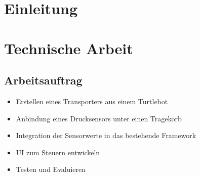 \documentclass[a4paper,12pt,headsepline,toc=flat]{scrartcl}
\begin{document}
	\tableofcontents
	\newpage
	
	\section{Einleitung}
	
	\newpage
	\section{Technische Arbeit}
	
	\subsection{Arbeitsauftrag}
		\begin{itemize}
			\item Erstellen eines Transporters aus einem Turtlebot
			\item Anbindung eines Drucksensors unter einen Tragekorb
			\item Integration der Sensorwerte in das bestehende Framework
			\item UI zum Steuern entwickeln
			\item Testen und Evaluieren
		\end{itemize}
	
\end{document}
